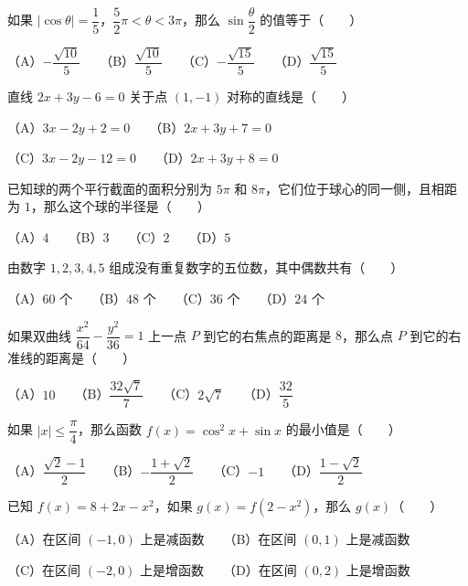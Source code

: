 \begin{question}

如果 $|\cos\theta|=\dfrac15$，$\dfrac52\pi<\theta<3\pi$，那么 $\sin\dfrac\theta2$ 的值等于\mbox{（　　）}

（A）$-\dfrac{\sqrt{10}}5$　　（B）$\dfrac{\sqrt{10}}5$　　（C）$-\dfrac{\sqrt{15}}5$　　（D）$\dfrac{\sqrt{15}}5$

\end{question}
\begin{question}

直线 $2x+3y-6=0$ 关于点 $(1,-1)$ 对称的直线是\mbox{（　　）}

（A）$3x-2y+2=0$　　（B）$2x+3y+7=0$

（C）$3x-2y-12=0$　　（D）$2x+3y+8=0$

\end{question}
\begin{question}

已知球的两个平行截面的面积分别为 $5\pi$ 和 $8\pi$，它们位于球心的同一侧，且相距为 $1$，那么这个球的半径是\mbox{（　　）}

（A）$4$　　（B）$3$　　（C）$2$　　（D）$5$

\end{question}
\begin{question}

由数字 $1,2,3,4,5$ 组成没有重复数字的五位数，其中偶数共有\mbox{（　　）}

（A）$60$ 个　　（B）$48$ 个　　（C）$36$ 个　　（D）$24$ 个

\end{question}
\begin{question}

如果双曲线 $\dfrac{x^2}{64}-\dfrac{y^2}{36}=1$ 上一点 $P$ 到它的右焦点的距离是 $8$，那么点 $P$ 到它的右准线的距离是\mbox{（　　）}

（A）$10$　　（B）$\dfrac{32\sqrt7}{7}$　　（C）$2\sqrt7$　　（D）$\dfrac{32}{5}$

\end{question}
\begin{question}

如果 $|x|\le\dfrac\pi4$，那么函数 $f(x)=\cos^2x+\sin x$ 的最小值是\mbox{（　　）}

（A）$\dfrac{\sqrt2-1}{2}$　　（B）$-\dfrac{1+\sqrt2}{2}$　　（C）$-1$　　（D）$\dfrac{1-\sqrt2}{2}$

\end{question}
\begin{question}

已知 $f(x)=8+2x-x^2$，如果 $g(x)=f(2-x^2)$，那么 $g(x)$\mbox{（　　）}

（A）在区间 $(-1,0)$ 上是减函数　　（B）在区间 $(0,1)$ 上是减函数

（C）在区间 $(-2,0)$ 上是增函数　　（D）在区间 $(0,2)$ 上是增函数

\end{question}
